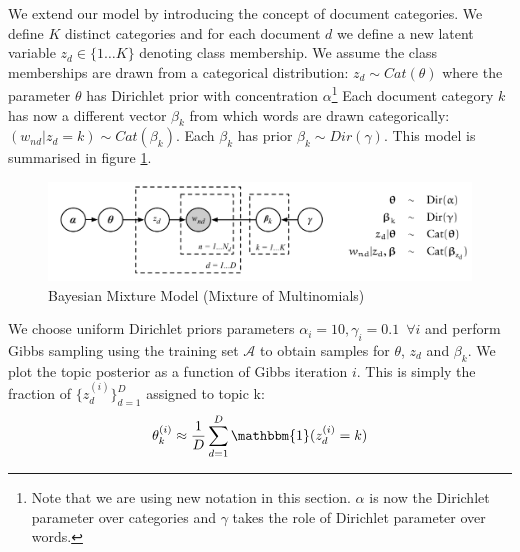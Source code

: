 \documentclass[]{article}
\newcommand{\Acal}{\mathcal{A}}
\newcommand{\figwidth}{0.6\linewidth}
\begin{document}
We extend our model by introducing the concept of document categories. We define $K$ distinct categories and for each document $d$ we define a new latent variable $z_d \in \{1 \dots K\}$ denoting class membership. We assume the class memberships are drawn from a categorical distribution: $z_d \sim Cat(\theta)$ where the parameter $\theta$ has Dirichlet prior with concentration $\alpha$\footnote{Note that we are using new notation in this section. $\alpha$ is now the Dirichlet parameter over categories and $\gamma$ takes the role of Dirichlet parameter over words.} Each document category $k$ has now a different vector $\beta_k$ from which words are drawn categorically: $(w_{nd} | z_d = k) \sim Cat(\beta_k)$. Each $\beta_k$ has prior $\beta_k \sim Dir(\gamma)$. This model is summarised in figure \ref{fig:bayesian-mixture}.
%
\begin{figure}[!h]
	\centering
	\includegraphics[width=\figwidth]{bayesian-mixture.png}
	\caption{Bayesian Mixture Model (Mixture of Multinomials)}
	\label{fig:bayesian-mixture}
\end{figure}

We choose uniform Dirichlet priors parameters $\alpha_i = 10, \gamma_i = 0.1 \enspace \forall i$ and perform Gibbs sampling using the training set $\Acal$ to obtain samples for $\theta$, $z_d$ and $\beta_k$. We plot the topic posterior as a function of Gibbs iteration $i$. This is simply the fraction of $\{z_d^{(i)}\}_{d=1}^{D}$ assigned to topic k:
%
\begin{equation}
	\theta^{(i)}_k \approx \frac{1}{D} \sum_{d=1}^{D} \mathbbm{1}(z^{(i)}_d = k)
	\label{eqn:bmm-topic-post}
\end{equation}
\end{document}
